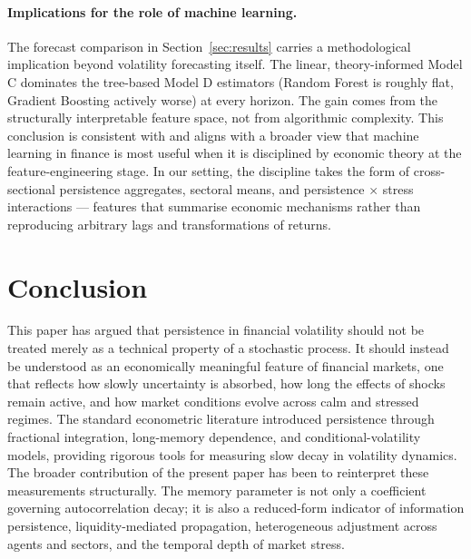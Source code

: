 \documentclass[11pt,a4paper]{article}
\begin{document}
\paragraph{Implications for the role of machine learning.}
The forecast comparison in Section~\ref{sec:results} carries a
methodological implication beyond volatility forecasting itself. The
linear, theory-informed Model C dominates the tree-based Model D
estimators (Random Forest is roughly flat, Gradient Boosting actively
worse) at every horizon. The gain comes from the structurally
interpretable feature space, not from algorithmic complexity. This
conclusion is consistent with \citet{gu2020empirical} and aligns with a
broader view that machine learning in finance is most useful when it is
disciplined by economic theory at the feature-engineering stage. In our
setting, the discipline takes the form of cross-sectional persistence
aggregates, sectoral means, and persistence $\times$ stress
interactions --- features that summarise economic mechanisms rather
than reproducing arbitrary lags and transformations of returns.

\section{Conclusion}
\label{sec:conclusion}

This paper has argued that persistence in financial volatility should
not be treated merely as a technical property of a stochastic process.
It should instead be understood as an economically meaningful feature of
financial markets, one that reflects how slowly uncertainty is absorbed,
how long the effects of shocks remain active, and how market conditions
evolve across calm and stressed regimes. The standard econometric
literature introduced persistence through fractional integration,
long-memory dependence, and conditional-volatility models, providing
rigorous tools for measuring slow decay in volatility dynamics. The
broader contribution of the present paper has been to reinterpret these
measurements structurally. The memory parameter is not only a
coefficient governing autocorrelation decay; it is also a reduced-form
indicator of information persistence, liquidity-mediated propagation,
heterogeneous adjustment across agents and sectors, and the temporal
depth of market stress.
\end{document}
